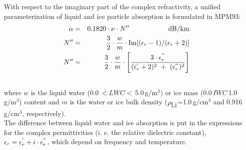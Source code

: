 {With respect to the imaginary part of the complex refractivity, a 
unified parameterization of liquid and ice particle absorption 
is formulated in MPM93:
\begin{eqnarray}
  \label{eq:abs_cloud}
  \alpha & = & 0.1820 \cdot \nu \cdot\imn\hspace*{20mm}
               \mbox{dB/km}\\
    \imn & = & \frac{3}{2} \cdot \frac{w}{m} \cdot 
               \Im{[(\er-1)/(\er+2)]}\nonumber\\
    \imn & = & \frac{3}{2} \cdot \frac{w}{m} \cdot 
               \left[\frac{3\cdot\ime}{(\ree+2)^2~+~(\ime)^2}\right]\nonumber\\
  \nonumber
\end{eqnarray}
where $w$ is the liquid water (0.0\,$<LWC<$\,5.0\,g/m$^3$) or ice
mass (0.0\,$IWC$\,1.0\,g/m$^3$) content and $m$ is the water 
or ice bulk density ($\rho_{\mbox{\rm l,i}}$=1.0\,g/cm$^3$ and 0.916\,g/cm$^3$, respectively).\\
The difference between liquid water and ice absorption is put in the 
expressions for the complex permittivities (i. e. the relative 
dielectric constant), $\epsilon_r=\epsilon^{'}_r+i\cdot\epsilon^{''}_r$, which depend on frequency
and temperature.

}
